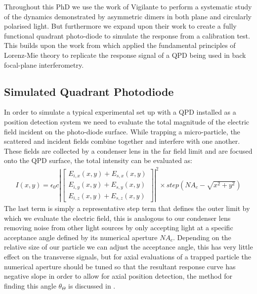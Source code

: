 Throughout this PhD we use the work of Vigilante to perform a systematic study of the dynamics demonstrated by asymmetric dimers in both plane and circularly polarised light. But furthermore we expand upon their work to create a fully functional quadrant photo-diode to simulate the response from a calibration test. This builds upon the work from \cite{Rohrbach2002} which applied the fundamental principles of Lorenz-Mie theory to replicate the response signal of a QPD being used in back focal-plane interferometry.


\subsection{Simulated Quadrant Photodiode}
\label{sec:simulated_QPD}
In order to simulate a typical experimental set up with a QPD installed as a position detection system we need to evaluate the total magnitude of the electric field incident on the photo-diode surface. While trapping a micro-particle, the scattered and incident fields combine together and interfere with one another. These fields are collected by a condenser lens in the far field limit and are focused onto the QPD surface, the total intensity can be evaluated as:
\begin{align}
I(x,y) = \epsilon_0c\left|
\begin{bmatrix} 
	E_{i,x}(x,y)+E_{s,x}(x,y) \\ 
	E_{i,y}(x,y)+E_{s,y}(x,y) \\ 
	E_{i,z}(x,y)+E_{s,z}(x,y)
\end{bmatrix} \right|^2 \times step(NA_c-\sqrt{x^2+y^2})
\end{align}
The last term is simply a representative step term that defines the outer limit by which we evaluate the electric field, this is analogous to our condenser lens removing noise from other light sources by only accepting light at a specific acceptance angle defined by its numerical aperture $NA_c$. Depending on the relative size of our particle we can adjust the acceptance angle, this has very little effect on the transverse signals, but for axial evaluations of a trapped particle the numerical aperture should be tuned so that the resultant response curve has negative slope in order to allow for axial position detection, the method for finding this angle $\theta_\Theta$ is discussed in \cite{Friedrich2012}.

